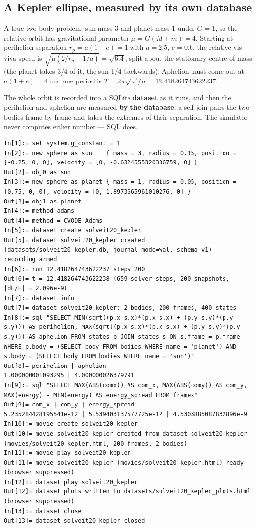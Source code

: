 \documentclass[11pt]{article}
\begin{document}
\subsection{A Kepler ellipse, measured by its own database}

A true two-body problem: sun mass 3 and planet mass 1 under $G = 1$,
so the relative orbit has gravitational parameter $\mu = G(M+m) = 4$.
Starting at perihelion separation $r_p = a(1-e) = 1$ with $a = 2.5$,
$e = 0.6$, the relative vis-viva speed is
$\sqrt{\mu(2/r_p - 1/a)} = \sqrt{6.4}$, split about the stationary
centre of mass (the planet takes 3/4 of it, the sun 1/4 backwards).
Aphelion must come out at $a(1+e) = 4$ and one period is
$T = 2\pi\sqrt{a^3/\mu} = 12.418264743622237$.

The whole orbit is recorded into a SQLite \textbf{dataset} as it runs,
and then the perihelion and aphelion are measured \textbf{by the
database}: a self-join pairs the two bodies frame by frame and takes
the extremes of their separation. The simulator never computes either
number --- SQL does.

\begin{lstlisting}
In[1]:= set system.g_constant = 1
In[2]:= new sphere as sun    { mass = 3, radius = 0.15, position = [-0.25, 0, 0], velocity = [0, -0.6324555320336759, 0] }
Out[2]= obj0 as sun
In[3]:= new sphere as planet { mass = 1, radius = 0.05, position = [0.75, 0, 0], velocity = [0, 1.8973665961010276, 0] }
Out[3]= obj1 as planet
In[4]:= method adams
Out[4]= method = CVODE Adams
In[5]:= dataset create solveit20_kepler
Out[5]= dataset solveit20_kepler created (datasets/solveit20_kepler.db, journal_mode=wal, schema v1) — recording armed
In[6]:= run 12.418264743622237 steps 200
Out[6]= t = 12.418264743622238 (659 solver steps, 200 snapshots, |dE/E| = 2.096e-9)
In[7]:= dataset info
Out[7]= dataset solveit20_kepler: 2 bodies, 200 frames, 400 states
In[8]:= sql "SELECT MIN(sqrt((p.x-s.x)*(p.x-s.x) + (p.y-s.y)*(p.y-s.y))) AS perihelion, MAX(sqrt((p.x-s.x)*(p.x-s.x) + (p.y-s.y)*(p.y-s.y))) AS aphelion FROM states p JOIN states s ON s.frame = p.frame WHERE p.body = (SELECT body FROM bodies WHERE name = 'planet') AND s.body = (SELECT body FROM bodies WHERE name = 'sun')"
Out[8]= perihelion | aphelion
1.000000001093295 | 4.000000026379791
In[9]:= sql "SELECT MAX(ABS(comx)) AS com_x, MAX(ABS(comy)) AS com_y, MAX(energy) - MIN(energy) AS energy_spread FROM frames"
Out[9]= com_x | com_y | energy_spread
5.235284428195541e-12 | 5.539403137577725e-12 | 4.5303885087832896e-9
In[10]:= movie create solveit20_kepler
Out[10]= movie solveit20_kepler created from dataset solveit20_kepler (movies/solveit20_kepler.html, 200 frames, 2 bodies)
In[11]:= movie play solveit20_kepler
Out[11]= movie solveit20_kepler (movies/solveit20_kepler.html) ready (browser suppressed)
In[12]:= dataset play solveit20_kepler
Out[12]= dataset plots written to datasets/solveit20_kepler_plots.html (browser suppressed)
In[13]:= dataset close
Out[13]= dataset solveit20_kepler closed
\end{lstlisting}
\end{document}
